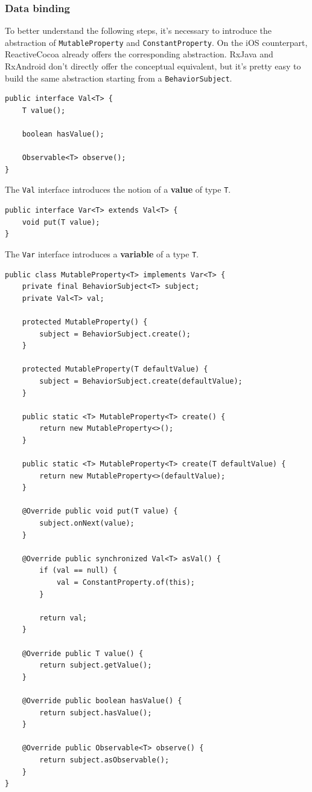 \subsubsection{Data binding}\label{data-binding}

To better understand the following steps, it's necessary to introduce
the abstraction of \texttt{MutableProperty} and
\texttt{ConstantProperty}. On the iOS counterpart, ReactiveCocoa already
offers the corresponding abstraction. RxJava and RxAndroid don't
directly offer the conceptual equivalent, but it's pretty easy to build
the same abstraction starting from a \texttt{BehaviorSubject}.

\begin{verbatim}
public interface Val<T> {
    T value();

    boolean hasValue();

    Observable<T> observe();
}
\end{verbatim}

The \texttt{Val} interface introduces the notion of a \textbf{value} of
type \texttt{T}.

\begin{verbatim}
public interface Var<T> extends Val<T> {
    void put(T value);
}
\end{verbatim}

The \texttt{Var} interface introduces a \textbf{variable} of a type
\texttt{T}.

\begin{verbatim}
public class MutableProperty<T> implements Var<T> {
    private final BehaviorSubject<T> subject;
    private Val<T> val;

    protected MutableProperty() {
        subject = BehaviorSubject.create();
    }

    protected MutableProperty(T defaultValue) {
        subject = BehaviorSubject.create(defaultValue);
    }

    public static <T> MutableProperty<T> create() {
        return new MutableProperty<>();
    }

    public static <T> MutableProperty<T> create(T defaultValue) {
        return new MutableProperty<>(defaultValue);
    }

    @Override public void put(T value) {
        subject.onNext(value);
    }

    @Override public synchronized Val<T> asVal() {
        if (val == null) {
            val = ConstantProperty.of(this);
        }

        return val;
    }

    @Override public T value() {
        return subject.getValue();
    }

    @Override public boolean hasValue() {
        return subject.hasValue();
    }

    @Override public Observable<T> observe() {
        return subject.asObservable();
    }
}
\end{verbatim}

